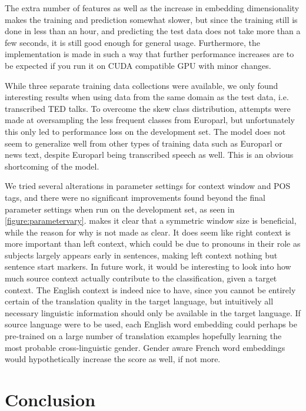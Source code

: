 \documentclass[11pt]{article}
\begin{document}
The extra number of features as well as the increase in embedding dimensionality makes the training and prediction somewhat slower, but since the training still is done in less than an hour, and predicting the test data does not take more than a few seconds, it is still good enough for general usage.
Furthermore, the implementation is made in such a way that further performance increases are to be expected if you run it on CUDA compatible GPU with minor changes.

While three separate training data collections were available, we only found interesting results when using data from the same domain as the test data, i.e. transcribed TED talks.
To overcome the skew class distribution, attempts were made at oversampling the less frequent classes from Europarl, but unfortunately this only led to performance loss on the development set.
The model does not seem to generalize well from other types of training data such as Europarl or news text, despite Europarl being transcribed speech as well.
This is an obvious shortcoming of the model.

We tried several alterations in parameter settings for context window and POS tags, and there were no significant improvements found beyond the final parameter settings when run on the development set, as seen in \cref{figure:parametervary}.
 makes it clear that a symmetric window size is beneficial, while the reason for why is not made as clear.
It does seem like right context is more important than left context, which could be due to pronouns in their role as subjects largely appears early in sentences, making left context nothing but sentence start markers.
In future work, it would be interesting to look into how much source context actually contribute to the classification, given a target context.
The English context is indeed nice to have, since you cannot be entirely certain of the translation quality in the target language, but intuitively all necessary linguistic information should only be available in the target language.
If source language were to be used, each English word embedding could perhaps be pre-trained on a large number of translation examples hopefully learning the most probable cross-linguistic gender.
Gender aware French word embeddings would hypothetically increase the score as well, if not more.

\section{Conclusion}
\end{document}

